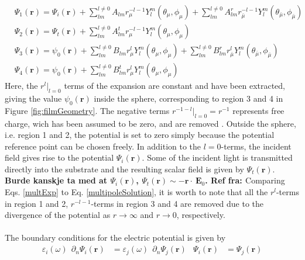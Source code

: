 \begin{subequations}
\label{multExp}
\begin{align}
   &\Psi_1(\boldsymbol{r}) = \Psi_i(\boldsymbol{r}) + \sum\limits_{lm}^{l \neq 0} A_{lm} r_{\mu}^{-l-1} Y_l^m(\theta_{\mu},\phi_{\mu})
   + \sum\limits_{lm}^{l \neq 0} A^r_{lm} r_{\bar{\mu}}^{-l-1} Y_l^m(\theta_{\bar{\mu}},\phi_{\bar{\mu}})
   \label{multExp1}\\
%
   &\Psi_2(\boldsymbol{r}) = \Psi_t(\boldsymbol{r}) + \sum\limits_{lm}^{l \neq 0} A_{lm}^t r_{\mu}^{-l-1} Y_l^m(\theta_{\mu},\phi_{\mu})
   \label{multExp2}\\
%
   &\Psi_3(\boldsymbol{r}) = \psi_0(\boldsymbol{r}) + \sum\limits_{lm}^{l \neq 0} B_{lm} r_{\mu}^l Y_l^m(\theta_{\mu},\phi_{\mu})
   + \sum\limits_{lm}^{l \neq 0} B^r_{lm} r_{\bar{\mu}}^l Y_l^m(\theta_{\bar{\mu}},\phi_{\bar{\mu}})
   \label{multExp3}\\
%
   &\Psi_4(\boldsymbol{r}) = \psi_0(\boldsymbol{r}) + \sum\limits_{lm}^{l \neq 0} B_{lm}^t r_{\mu}^l Y_l^m(\theta_{\mu},\phi_{\mu})
   \label{multExp4}
\end{align}
\end{subequations}
%
Here, the $r^l\big|_{l=0}$ terms of the expansion are constant and have been extracted, 
giving the value $\psi_0(\boldsymbol{r})$ inside the sphere, corresponding to region 3 and 4 
in Figure \ref{fig:filmGeometry}.
The negative terms $r^{-1-l}\big|_{l=0} = r^{-1}$ represents free charge, wich has been assumed to be
zero, and are removed \cite[p.~79]{BedeauxVliegerBook}. 
Outside the sphere, i.e. region 1 and 2, the potential is set to zero 
simply because the potential reference point can be chosen freely. 
In addition to the $l=0$-terms, the incident field gives rise to the potential $\Psi_i(\boldsymbol{r})$. 
Some of the incident light is transmitted directly into the substrate and the resulting scalar field
is given by $\Psi_t(\boldsymbol{r})$.
%
\textbf{Burde kanskje ta med at $\Psi_i(\boldsymbol{r})$, $\Psi_t(\boldsymbol{r}) \sim -\boldsymbol{r}\cdot\
\boldsymbol{E}_0$. Ref fra: \cite[p.~95]{BedeauxVliegerBook}}
%
Comparing Eqs. \eqref{multExp} to Eq. \eqref{multipoleSolution}, it is worth to note that all the
$r^l$-terms in region 1 and 2, $r^{-l-1}$-terms in region 3 and 4 are removed due to the divergence
of the potential as $r \rightarrow \infty$ and $r \rightarrow 0$, respectively.
\\
\\
The boundary conditions for the electric potential is given by \cite[p.~89-90]{Griffiths}
\begin{align}
   \varepsilon\!_i\!(\omega) \:\: \partial_n \Psi_i(\boldsymbol{r}) &= \varepsilon\!_j\!(\omega) \:\:\partial_n \Psi\!_j(\boldsymbol{r})
   &\Psi_i(\boldsymbol{r}) &=\Psi\!_j(\boldsymbol{r})
\end{align}

